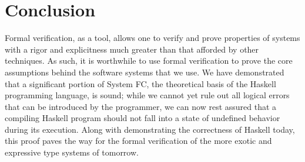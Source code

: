 \documentclass{sig-alternate}
\begin{document}
\section{Conclusion}
\label{sec:conclusion}

Formal verification, as a tool, allows one to verify and prove properties of systems with a rigor and explicitness much greater than that afforded by other techniques. As such, it is worthwhile to use formal verification to prove the core assumptions behind the software systems that we use. We have demonstrated that a significant portion of System FC, the theoretical basis of the Haskell programming language, is sound; while we cannot yet rule out all logical errors that can be introduced by the programmer, we can now rest assured that a compiling Haskell program should not fall into a state of undefined behavior during its execution. Along with demonstrating the correctness of Haskell today, this proof paves the way for the formal verification of the more exotic and expressive type systems of tomorrow.


\vspace{175pt}
\end{document}
